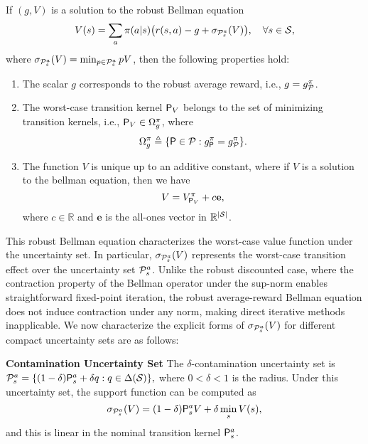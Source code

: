 \begin{theorem}\label{thm:robust Bellman} 
If $(g,V)$ is a solution to the robust Bellman equation
\begin{equation}\label{eq:bellman}
    V(s) = \sum_{a} \pi(a|s) \big(r(s,a) - g + \sigma_{\mathcal{P}^a_s}(V) \big), \quad \forall s \in \mathcal{S},
\end{equation}
where $\sigma_{\mathcal{P}^a_s}(V) = \min_{p\in\mathcal{P}^a_s} p V$, then the following properties hold:
\begin{enumerate}
    \item The scalar $g$ corresponds to the robust average reward, i.e., $g = g^\pi_{\mathcal{P}}$.
    \item The worst-case transition kernel $\mathsf P_V$ belongs to the set of minimizing transition kernels, i.e., $\mathsf P_V \in \Omega^\pi_g$, where 
    \begin{equation}
        \Omega^\pi_g \triangleq \{ \mathsf P \in \mathcal{P} : g^\pi_\mathsf P = g^\pi_{\mathcal{P}} \}.
    \end{equation}
    \item The function $V$ is unique up to an additive constant, where if $V$ is a solution to the bellman equation, then we have 
    \begin{equation}
         V = V^\pi_{\mathsf P_V} + c \mathbf{e},
    \end{equation}
    where $c \in \mathbb{R}$ and $\mathbf{e}$ is the all-ones vector in $\mathbb{R}^{|\mathcal{S}|}$.
\end{enumerate}
\end{theorem}

This robust Bellman equation characterizes the worst-case value function under the uncertainty set. In particular, $\sigma_{\mathcal{P}^a_s}(V)$ represents the worst-case transition effect over the uncertainty set $\mathcal{P}^a_s$. Unlike the robust discounted case, where the contraction property of the Bellman operator under the sup-norm enables straightforward fixed-point iteration, the robust average-reward Bellman equation does not induce contraction under any norm, making direct iterative methods inapplicable. We now characterize the explicit forms of $\sigma_{\mathcal{P}^a_s}(V)$ for different compact uncertainty sets are as follows:

\noindent \textbf{Contamination Uncertainty Set}\label{sec:con}
The $\delta$-contamination uncertainty set is
$
    \mathcal{P}^a_s=\{(1-\delta)\mathsf P^a_s+\delta q: q\in\Delta(\mathcal{S}) \}, 
$
where $0<\delta<1$ is the radius. Under this uncertainty set, the support function can be computed as 
\begin{equation}\label{eq:contamination}
    \sigma_{\mathcal{P}^a_s}(V)=(1-\delta)\mathsf P^a_s V+\delta \min_s V(s),
\end{equation}
and this is linear in the nominal transition kernel $\mathsf P^a_s$. 

